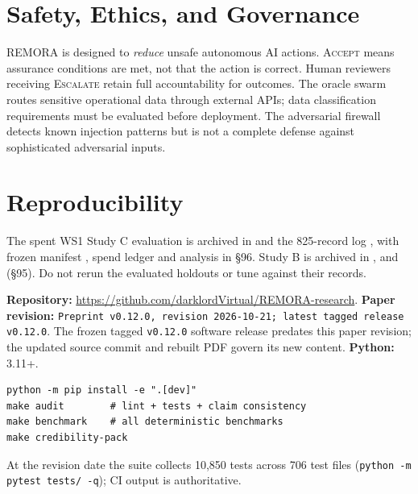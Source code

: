 \documentclass[10pt,twocolumn]{article}
\newcommand{\paperversion}{Preprint v0.12.0, revision 2026-10-21; latest tagged release \texttt{v0.12.0}}
\begin{document}
\section{Safety, Ethics, and Governance}
\label{sec:safety}

REMORA is designed to \emph{reduce} unsafe autonomous AI actions.
\textsc{Accept} means assurance conditions are met, not that the action
is correct. Human reviewers receiving \textsc{Escalate} retain full
accountability for outcomes. The oracle swarm routes sensitive
operational data through external APIs; data classification requirements
must be evaluated before deployment. The adversarial firewall detects
known injection patterns but is not a complete defense against
sophisticated adversarial inputs.

\section{Reproducibility}
\label{sec:repro}

The spent WS1 Study C evaluation is archived in
 and the
825-record log ,
with frozen manifest ,
spend ledger 
and analysis in  \S96.
Study B is archived in ,
 and
 (\S95).
Do not rerun the evaluated holdouts or tune against their records.


\textbf{Repository:} \url{https://github.com/darklordVirtual/REMORA-research}.
\textbf{Paper revision:} \texttt{\paperversion}. The frozen tagged
\texttt{v0.12.0} software release predates this paper revision;
the updated source commit and rebuilt PDF govern its new content.
\textbf{Python:} 3.11+.

\begin{lstlisting}
python -m pip install -e ".[dev]"
make audit        # lint + tests + claim consistency
make benchmark    # all deterministic benchmarks
make credibility-pack
\end{lstlisting}

At the revision date the suite collects 10{,}850 tests across 706 test
files (\texttt{python -m pytest tests/ -q}); CI output is authoritative.
\end{document}
